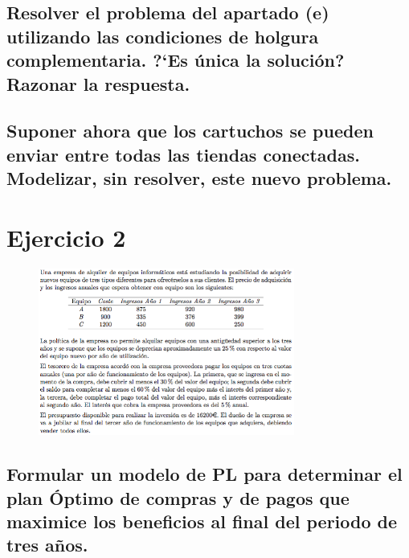 \documentclass[10pt, a4paper]{article}
\begin{document}
			\paragraph{}


		\subsection{Resolver el problema del apartado (e) utilizando las condiciones de holgura complementaria. ?`Es única la solución? Razonar la respuesta.}

			\paragraph{}


		\subsection{Suponer ahora que los cartuchos se pueden enviar entre todas las tiendas conectadas. Modelizar, sin resolver, este nuevo problema.}

			\paragraph{}


    \section{Ejercicio 2}

        \begin{figure}[H]
        \centering
            \includegraphics[width=0.75\textwidth]{res/Exercise_2.png}
        \end{figure}

		\subsection{Formular un modelo de PL para determinar el plan Óptimo de compras y de pagos que maximice los beneficios al final del periodo de tres años.}
\end{document}

